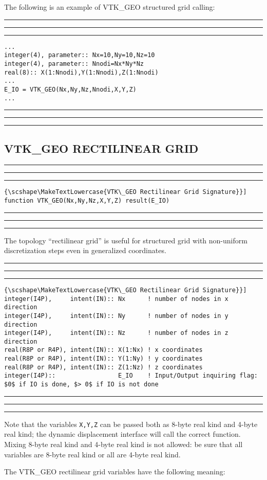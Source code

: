 \documentclass[pagesize=pdftex,fontsize=10pt,paper=a4,oneside]{scrbook}
\DeclareRobustCommand{\MarginNote}[1]{\marginpar{%
\slshape\footnotesize%
\parindent=0pt\lineskip=0pt\lineskiplimit=0pt%
\tolerance=2000\hyphenpenalty=300\exhyphenpenalty=300%
\doublehyphendemerits=100000\finalhyphendemerits=\doublehyphendemerits%
\raggedright\hspace{0pt}#1}}
\newenvironment{boxred}[1]%
               {%
                \noindent\hspace*{-0.025\textwidth}%
                \color{Maroon}%
                \rule[-5.8pt]{0.6pt}{6pt}\hspace*{-0.6pt}\rule{1.05\textwidth}{0.6pt}\hspace*{-0.6pt}\rule[-5.8pt]{0.6pt}{6pt}%
                \color{black}%
                \vspace*{0.6pt}\MarginNote{\color{Maroon}{#1}}%
               }%
               {%
                \noindent\hspace*{-0.025\textwidth}%
                \color{Maroon}%
                \rule[0pt]{0.6pt}{6pt}\hspace*{-0.6pt}\rule{1.05\textwidth}{0.6pt}\hspace*{-0.6pt}\rule[0pt]{0.6pt}{6pt}%
                \color{black}%
                \vspace*{2mm}%
               }
\newcommand{\virgo}[1]{``{#1}''}
\DeclareRobustCommand{\MaiuscolettoBS}[1]{\textls[80]{\scshape\MakeTextLowercase{#1}}}
\begin{document}
The following is an example of VTK\_GEO structured grid calling:

\begin{boxred}{VTK\_GEO Structured Grid Calling}
\begin{verbatim}
...
integer(4), parameter:: Nx=10,Ny=10,Nz=10
integer(4), parameter:: Nnodi=Nx*Ny*Nz
real(8):: X(1:Nnodi),Y(1:Nnodi),Z(1:Nnodi)
...
E_IO = VTK_GEO(Nx,Ny,Nz,Nnodi,X,Y,Z)
...
\end{verbatim}
\end{boxred}

\subsection{VTK\_GEO RECTILINEAR GRID}

\begin{boxred}{}
\begin{lstlisting}[style=signature,title=\color{Maroon}\MaiuscolettoBS{VTK\_GEO Rectilinear Grid Signature}]
function VTK_GEO(Nx,Ny,Nz,X,Y,Z) result(E_IO)
\end{lstlisting}
\end{boxred}

The topology \virgo{rectilinear grid} is useful for structured grid with non-uniform discretization steps even
in generalized coordinates.

\begin{boxred}{}
\begin{lstlisting}[style=variables,title=\color{Maroon}\MaiuscolettoBS{VTK\_GEO Rectilinear Grid Signature}]
integer(I4P),     intent(IN):: Nx      ! number of nodes in x direction
integer(I4P),     intent(IN):: Ny      ! number of nodes in y direction
integer(I4P),     intent(IN):: Nz      ! number of nodes in z direction
real(R8P or R4P), intent(IN):: X(1:Nx) ! x coordinates
real(R8P or R4P), intent(IN):: Y(1:Ny) ! y coordinates
real(R8P or R4P), intent(IN):: Z(1:Nz) ! z coordinates
integer(I4P)::                 E_IO    ! Input/Output inquiring flag: $0$ if IO is done, $> 0$ if IO is not done
\end{lstlisting}
\end{boxred}

Note that the variables \texttt{X,Y,Z} can be passed both as 8-byte real kind and 4-byte real kind; the dynamic
displacement interface will call the correct function. Mixing 8-byte real kind and 4-byte real kind is not allowed: be
sure that all variables are 8-byte real kind or all are 4-byte real kind.

The VTK\_GEO rectilinear grid variables have the following meaning:
\end{document}
